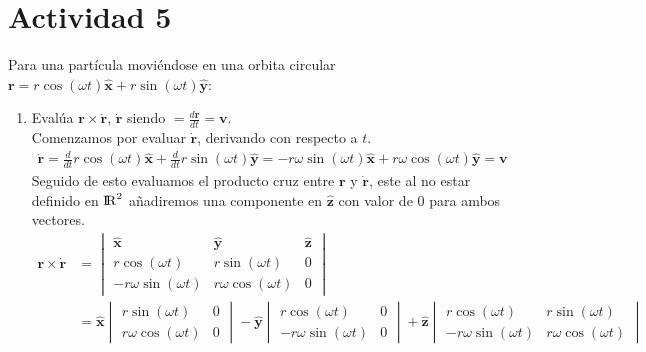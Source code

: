 \documentclass{article}
\begin{document}
\section{Actividad 5}
Para una partícula moviéndose en una orbita circular $\pmb{r} = r\cos(\omega t)\pmb{\hat{x}}+ r\sin(\omega t)\pmb{\hat{y}}$:
\begin{enumerate}
  \item Evalúa $\pmb{r}\times \pmb{\dot{r}}$, $\pmb{\dot{r}}$ siendo $= \frac{d\pmb{r}}{dt}=\pmb{v}$.\\
    Comenzamos por evaluar $\pmb{\dot{r}}$, derivando con respecto a $t$.
    \begin{equation*}
        \begin{split}
           \pmb{\dot{r}}=\frac{d}{dt}r\cos(\omega t)\pmb{\hat{x}} + \frac{d}{dt}r\sin(\omega t)\pmb{\hat{y}}=-r\omega\sin(\omega t)\pmb{\hat{x}}+r\omega\cos(\omega t)\pmb{\hat{y}}=\pmb{v}
        \end{split}
    \end{equation*}
    Seguido de esto evaluamos el producto cruz entre $\pmb{r}$ y $\pmb{\dot{r}}$, este al no estar definido en ${\rm I\!R}^2$ añadiremos una componente en $\pmb{\hat{z}}$ con valor de $0$ para ambos vectores.
    \begin{equation*}
         \begin{split}
            \pmb{r}\times \pmb{\dot{r}}&= \begin{vmatrix}
            \pmb{\hat{x}} & \pmb{\hat{y}} & \pmb{\hat{z}} \\
            r\cos(\omega t) & r\sin(\omega t) & 0 \\
            -r\omega\sin(\omega t) & r\omega\cos(\omega t) & 0
            \end{vmatrix}\\
            &=\pmb{\hat{x}}\begin{vmatrix}
            r\sin(\omega t) & 0 \\
            r\omega\cos(\omega t) & 0
            \end{vmatrix}-\pmb{\hat{y}}\begin{vmatrix}
            r\cos(\omega t) & 0\\
            -r\omega\sin(\omega t) & 0
            \end{vmatrix}+\pmb{\hat{z}}\begin{vmatrix}
            r\cos(\omega t) & r\sin(\omega t)\\
            -r\omega\sin(\omega t) & r\omega\cos(\omega t)
            \end{vmatrix}\\

\end{split}
\end{equation*}
\end{enumerate}
\end{document}
